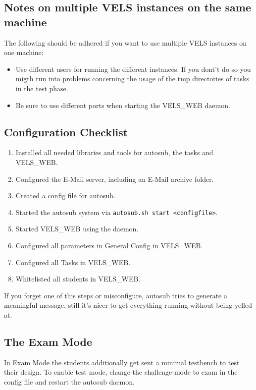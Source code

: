 \subsection{Notes on multiple VELS instances on the same machine}

The following should be adhered if you want to use multiple VELS instances on
one machine:
\begin{itemize}
\item Use different users for running the different instances. If you dont't do
	so you migth run into problems concerning the usage of the tmp directories of
	tasks in the test phase.
\item Be sure to use different ports when starting the VELS\_WEB daemon.
\end{itemize}

\subsection{Configuration Checklist} \label{sub:configChecklist}

\begin{enumerate}
\item Installed all needed libraries and tools for autosub, the tasks and VELS\_WEB.
\item Configured the E-Mail server, including an E-Mail archive folder.
\item Created a config file for autosub.
\item Started the autosub system via {\tt autosub.sh start <configfile>}.
\item Started VELS\_WEB using the daemon.
\item Configured all parameters in General Config in VELS\_WEB.
\item Configured all Tasks in VELS\_WEB.
\item Whitelisted all students in VELS\_WEB.
\end{enumerate}

If you forget one of this steps or misconfigure, autosub tries to generate a meaningful
message, still it's nicer to get everything running without being yelled at.

\subsection{The Exam Mode}\label{sub:exammode}
In Exam Mode the students additionally get sent a minimal testbench to test their design.
To enable test mode, change the challenge-mode to exam in the config file and restart
the autosub daemon.

